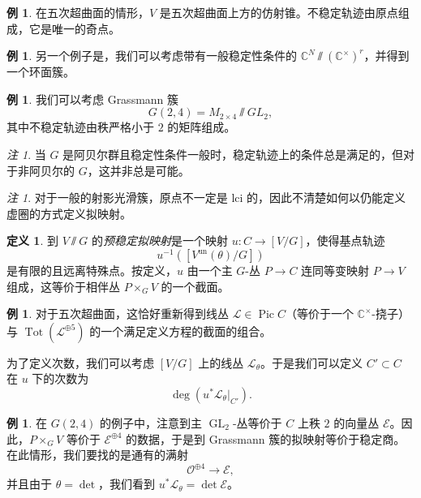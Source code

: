 \documentclass{amsart}
\theoremstyle{definition}
\newtheorem{defn}[thm]{定义}
\newtheorem{exm}[thm]{例}
\theoremstyle{remark}
\newtheorem{rmk}[thm]{注}
\theoremstyle{plain}
\theoremstyle{definition}
\theoremstyle{remark}
\newcommand{\C}{\mathbb{C}}
\newcommand{\mc}[1]{\mathcal{#1}}
\newcommand{\mr}[1]{\mathrm{#1}}
\newcommand{\on}[1]{\operatorname{#1}}
\newcommand{\1}{\mathbf{1}}
\newcommand{\2}{\mathbf{2}}
\newcommand{\3}{\mathbf{3}}
\DeclareMathOperator{\Pic}{Pic}
\begin{document}
\begin{exm}
    在五次超曲面的情形，\(V\) 是五次超曲面上方的仿射锥。不稳定轨迹由原点组成，它是唯一的奇点。
\end{exm}

\begin{exm}
    另一个例子是，我们可以考虑带有一般稳定性条件的 \(\C^N \sslash (\C^{\times})^r\)，并得到一个环面簇。
\end{exm}

\begin{exm}
    我们可以考虑 Grassmann 簇
    \[ G(2,4) = M_{2\times 4} \sslash GL_2, \]
    其中不稳定轨迹由秩严格小于 \(2\) 的矩阵组成。
\end{exm}

\begin{rmk}
    当 \(G\) 是阿贝尔群且稳定性条件一般时，稳定轨迹上的条件总是满足的，但对于非阿贝尔的 \(G\)，这并非总是可能。
\end{rmk}

\begin{rmk}
    对于一般的射影光滑簇，原点不一定是 lci 的，因此不清楚如何以仍能定义虚圈的方式定义拟映射。
\end{rmk}

\begin{defn}
    到 \(V \sslash G\) 的\textit{预稳定拟映射}是一个映射 \(u \colon C \to [V/G]\)，使得基点轨迹
    \[ u^{-1}([V^{\mr{un}}(\theta) / G]) \]
    是有限的且远离特殊点。按定义，\(u\) 由一个主 \(G\)-丛 \(P \to C\) 连同等变映射 \(P \to V\) 组成，这等价于相伴丛 \(P \times_G V\) 的一个截面。
\end{defn}

\begin{exm}
    对于五次超曲面，这恰好重新得到线丛 \(\mc{L} \in \Pic C\)（等价于一个 \(\C^{\times}\)-挠子）与 \(\on{Tot}(\mc{L}^{\oplus 5})\) 的一个满足定义方程的截面的组合。
\end{exm}

为了定义次数，我们可以考虑 \([V/G]\) 上的线丛 \(\mc{L}_{\theta}\)。于是我们可以定义 \(C' \subset C\) 在 \(u\) 下的次数为
\[ \deg (u^* \mc{L}_{\theta}|_{C'}). \]

\begin{exm}
    在 \(G(2,4)\) 的例子中，注意到主 \(\on{GL}_2\)-丛等价于 \(C\) 上秩 \(2\) 的向量丛 \(\mc{E}\)。因此，\(P \times_G V\) 等价于 \(\mc{E}^{\oplus 4}\) 的数据，于是到 Grassmann 簇的拟映射等价于稳定商。在此情形，我们要找的是通有的满射
    \[ \mc{O}^{\oplus 4} \to \mc{E}, \]
    并且由于 \(\theta = \det\)，我们看到 \(u^* \mc{L}_{\theta} = \det \mc{E}\)。
\end{exm}
\end{document}
